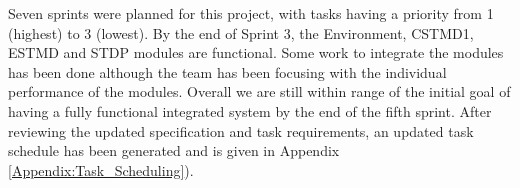 \par  Seven sprints were planned for this project, with tasks having a priority from 1 (highest) to 3 (lowest). By the end of Sprint 3, the Environment, CSTMD1, ESTMD and STDP modules are functional. Some work to integrate the modules has been done although the team has been focusing with the individual performance of the modules.  Overall we are still within range of the initial goal of having a fully functional integrated system by the end of the fifth sprint. After reviewing the updated specification and task requirements, an updated task schedule has been generated and is given in Appendix \ref{Appendix:Task_Scheduling}).
